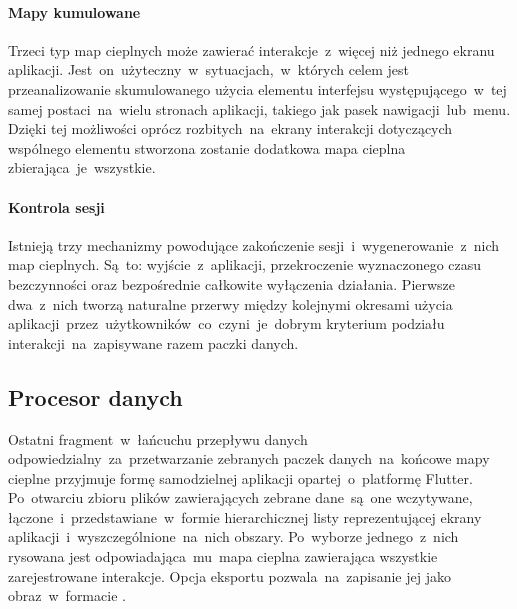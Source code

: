 
\paragraph{Mapy kumulowane} Trzeci typ map cieplnych może zawierać interakcje~z~więcej niż jednego ekranu aplikacji. Jest~on~użyteczny~w~sytuacjach,~w~których celem jest przeanalizowanie skumulowanego użycia elementu interfejsu występującego~w~tej samej postaci~na~wielu stronach aplikacji, takiego jak pasek nawigacji~lub~menu. Dzięki tej możliwości oprócz rozbitych~na~ekrany interakcji dotyczących wspólnego elementu stworzona zostanie dodatkowa mapa cieplna zbierająca~je~wszystkie.


\paragraph{Kontrola sesji}
Istnieją trzy mechanizmy powodujące zakończenie sesji~i~wygenerowanie~z~nich map cieplnych. Są~to: wyjście~z~aplikacji, przekroczenie wyznaczonego czasu bezczynności oraz bezpośrednie całkowite wyłączenia działania. Pierwsze dwa~z~nich tworzą naturalne przerwy między kolejnymi okresami użycia aplikacji~przez~użytkowników~co~czyni~je~dobrym kryterium podziału interakcji~na~zapisywane razem paczki danych.

\newcommand*\circled[1]{\tikz[baseline=(char.base)]{\node[shape=circle,draw,inner sep=1.2pt] (char) {#1};}}

\subsection{Procesor danych}
Ostatni fragment~w~łańcuchu przepływu danych odpowiedzialny~za~przetwarzanie zebranych paczek danych~na~końcowe mapy cieplne przyjmuje formę samodzielnej aplikacji opartej~o~platformę Flutter. Po~otwarciu zbioru plików zawierających zebrane dane~są~one wczytywane, łączone~i~przedstawiane~w~formie hierarchicznej listy reprezentującej ekrany aplikacji~i~wyszczególnione~na~nich obszary. Po~wyborze jednego~z~nich rysowana jest odpowiadająca~mu~mapa cieplna zawierająca wszystkie zarejestrowane interakcje. Opcja eksportu pozwala~na~zapisanie jej jako obraz~w~formacie .


